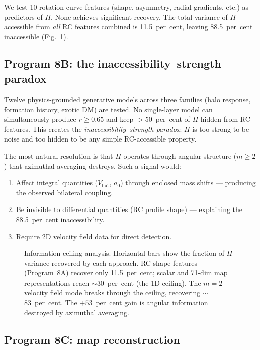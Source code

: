 \documentclass[fleqn,usenatbib]{mnras}
\newcommand{\vflat}{V_\mathrm{flat}}
\newcommand{\azero}{a_0}
\newcommand{\mtwo}{m{=}2}
\begin{document}
We test 10 rotation curve features (shape, asymmetry, radial gradients, etc.) as predictors of $H$.
None achieves significant recovery.
The total variance of $H$ accessible from \emph{all} RC features combined is 11.5~per~cent, leaving 88.5~per~cent inaccessible (Fig.~\ref{fig:ceiling}).

\subsection{Program 8B: the inaccessibility--strength paradox}

Twelve physics-grounded generative models across three families (halo response, formation history, exotic DM) are tested.
No single-layer model can simultaneously produce $r \geq 0.65$ and keep $> 50$~per~cent of $H$ hidden from RC features.
This creates the \emph{inaccessibility--strength paradox}: $H$ is too strong to be noise and too hidden to be any simple RC-accessible property.

The most natural resolution is that $H$ operates through angular structure ($m \geq 2$) that azimuthal averaging destroys.
Such a signal would:
\begin{enumerate}
\item Affect integral quantities ($\vflat$, $\azero$) through enclosed mass shifts --- producing the observed bilateral coupling.
\item Be invisible to differential quantities (RC profile shape) --- explaining the 88.5~per~cent inaccessibility.
\item Require 2D velocity field data for direct detection.
\end{enumerate}

\begin{figure}
\centering

\caption{Information ceiling analysis. Horizontal bars show the fraction of $H$ variance recovered by each approach. RC shape features (Program~8A) recover only 11.5~per~cent; scalar and 71-dim map representations reach $\sim$30~per~cent (the 1D ceiling). The $\mtwo$ velocity field mode breaks through the ceiling, recovering $\sim$83~per~cent. The $+53$~per~cent gain is angular information destroyed by azimuthal averaging.}
\label{fig:ceiling}
\end{figure}

\subsection{Program 8C: map reconstruction}
\end{document}
